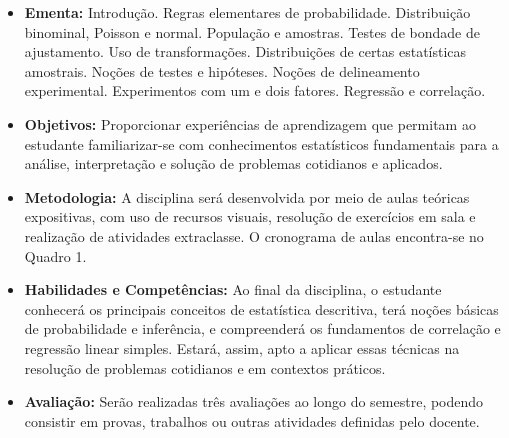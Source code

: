 \documentclass[11pt,a4paper]{report}
\begin{document}
\cabecalho

\begin{itemize}[label={},itemindent=-2em,leftmargin=2em]
    \item {\bf Ementa:} Introdução. Regras elementares de probabilidade. Distribuição binominal, Poisson e normal. População e amostras. Testes de bondade de ajustamento. Uso de transformações. Distribuições de certas estatísticas amostrais. Noções de testes e hipóteses. Noções de delineamento experimental. Experimentos com um e dois fatores. Regressão e correlação.
    
    \item {\bf Objetivos:} Proporcionar experiências de aprendizagem que permitam ao estudante familiarizar-se com conhecimentos estatísticos fundamentais para a análise, interpretação e solução de problemas cotidianos e aplicados.
    
    \item {\bf Metodologia:} A disciplina será desenvolvida por meio de aulas teóricas expositivas, com uso de recursos visuais, resolução de exercícios em sala e realização de atividades extraclasse. O cronograma de aulas encontra-se no Quadro 1.
    
    \item {\bf Habilidades e Competências:} Ao final da disciplina, o estudante conhecerá os principais conceitos de estatística descritiva, terá noções básicas de probabilidade e inferência, e compreenderá os fundamentos de correlação e regressão linear simples. Estará, assim, apto a aplicar essas técnicas na resolução de problemas cotidianos e em contextos práticos.
    
    \item {\bf Avaliação:} Serão realizadas três avaliações ao longo do semestre, podendo consistir em provas, trabalhos ou outras atividades definidas pelo docente.
\end{itemize}
\end{document}
